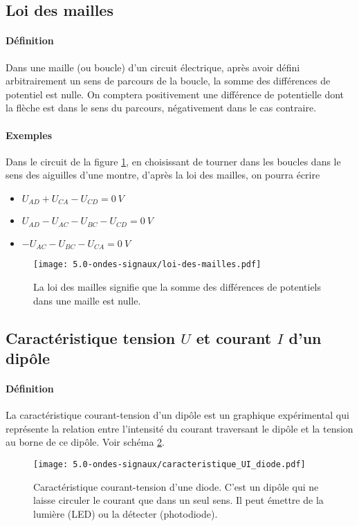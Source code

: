 \subsection{Loi des mailles}
\paragraph{Définition} Dans une maille (ou boucle) d'un circuit électrique, après avoir défini arbitrairement un sens de parcours de la boucle, la somme des différences de potentiel est nulle. On comptera positivement une différence de potentielle dont la flèche est dans le sens du parcours, négativement dans le cas contraire.
\paragraph{Exemples} Dans le circuit de la figure \ref{fig:loi-des-mailles}, en choisissant de tourner dans les boucles dans le sens des aiguilles d'une montre, d'après la loi des mailles, on pourra écrire 
\begin{itemize}
 \item $U_{AD} + U_{CA} - U_{CD} = 0~ V$
 \item $U_{AD} - U_{AC} - U_{BC} - U_{CD}  = 0~ V$
 \item $-U_{AC} - U_{BC} - U_{CA} = 0~ V$
\end{itemize}
\begin{figure}[h!]
  \begin{center}
      \texttt{[image: 5.0-ondes-signaux/loi-des-mailles.pdf]}
  \end{center}
  \caption{La loi des mailles signifie que la somme des différences de potentiels dans une maille est nulle.}
  \label{fig:loi-des-mailles}
\end{figure}

\subsection{Caractéristique tension $U$ et courant $I$ d'un dipôle}
 \paragraph{Définition}La caractéristique courant-tension d'un dipôle est un graphique expérimental qui représente la relation entre l'intensité du courant traversant le dipôle et la tension au borne de ce dipôle. Voir schéma \ref{fig:caracteristique_UI_diode}.
\begin{figure}[h!]
  \begin{center}
      \texttt{[image: 5.0-ondes-signaux/caracteristique\_UI\_diode.pdf]}
  \end{center}
  \caption{Caractéristique courant-tension d'une diode. C'est un dipôle qui ne laisse circuler le courant que dans un seul sens. Il peut émettre de la lumière (LED) ou la détecter (photodiode).}
  \label{fig:caracteristique_UI_diode}
\end{figure}
